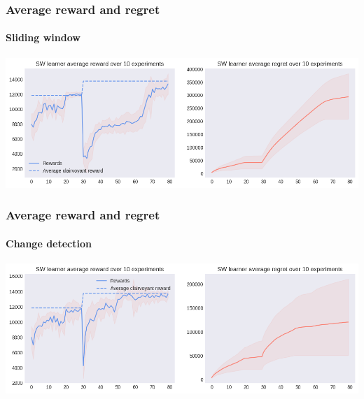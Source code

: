 
\begin{frame}[plain]

\frametitle{Average reward and regret}
\framesubtitle{Sliding window}

\begin{center}
    \hspace*{-2.8em}
    \includegraphics[scale=0.5]{img/Graphs/non_stationary/image2.png}
\end{center}

\end{frame}


\begin{frame}[plain]

\frametitle{Average reward and regret}
\framesubtitle{Change detection}

\begin{center}
    \hspace*{-2.8em}
    \includegraphics[scale=0.5]{img/Graphs/non_stationary/image3.png}
\end{center}

\end{frame}


